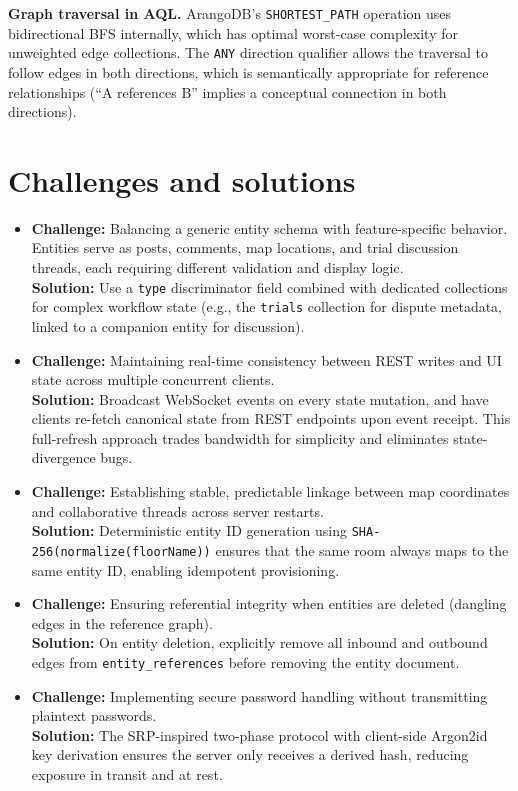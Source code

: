 \documentclass[13pt,a4paper]{report}
\begin{document}
\textbf{Graph traversal in AQL.} ArangoDB's \texttt{SHORTEST\_PATH} operation uses bidirectional BFS internally, which has optimal worst-case complexity for unweighted edge collections. The \texttt{ANY} direction qualifier allows the traversal to follow edges in both directions, which is semantically appropriate for reference relationships (``A references B'' implies a conceptual connection in both directions).

\section{Challenges and solutions}
\begin{itemize}
    \item \textbf{Challenge:} Balancing a generic entity schema with feature-specific behavior. Entities serve as posts, comments, map locations, and trial discussion threads, each requiring different validation and display logic. \\
    \textbf{Solution:} Use a \texttt{type} discriminator field combined with dedicated collections for complex workflow state (e.g., the \texttt{trials} collection for dispute metadata, linked to a companion entity for discussion).

    \item \textbf{Challenge:} Maintaining real-time consistency between REST writes and UI state across multiple concurrent clients. \\
    \textbf{Solution:} Broadcast WebSocket events on every state mutation, and have clients re-fetch canonical state from REST endpoints upon event receipt. This full-refresh approach trades bandwidth for simplicity and eliminates state-divergence bugs.

    \item \textbf{Challenge:} Establishing stable, predictable linkage between map coordinates and collaborative threads across server restarts. \\
    \textbf{Solution:} Deterministic entity ID generation using \texttt{SHA-256(normalize(floorName))} ensures that the same room always maps to the same entity ID, enabling idempotent provisioning.

    \item \textbf{Challenge:} Ensuring referential integrity when entities are deleted (dangling edges in the reference graph). \\
    \textbf{Solution:} On entity deletion, explicitly remove all inbound and outbound edges from \texttt{entity\_references} before removing the entity document.

    \item \textbf{Challenge:} Implementing secure password handling without transmitting plaintext passwords. \\
    \textbf{Solution:} The SRP-inspired two-phase protocol with client-side Argon2id key derivation ensures the server only receives a derived hash, reducing exposure in transit and at rest.
\end{itemize}
\end{document}
